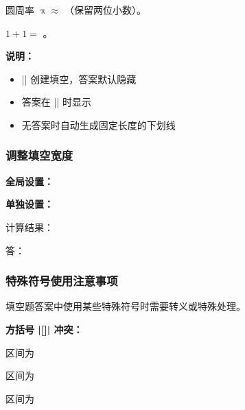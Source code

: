 \begin{latexcode}
  \begin{question}
    圆周率 $\uppi \approx$ \fillin[3.14]（保留两位小数）。
  \end{question}

  \begin{question}
    $1 + 1 = $ \fillin[2]。
  \end{question}
\end{latexcode}

\textbf{说明：}
\begin{itemize}
  \item |\fillin[答案]| 创建填空，答案默认隐藏
  \item 答案在 || 时显示
  \item 无答案时自动生成固定长度的下划线
\end{itemize}

\subsubsection{调整填空宽度}

\textbf{全局设置：}

\begin{latexcode}
\end{latexcode}

\textbf{单独设置：}

\begin{latexcode}
  计算结果：\fillin[width = 8em][很长的答案内容]

  答：\fillin[width = 2em][是]
\end{latexcode}

\subsubsection{特殊符号使用注意事项}

填空题答案中使用某些特殊符号时需要转义或特殊处理。

\textbf{方括号 |[]| 冲突：}

\begin{latexcode}
  区间为 \fillin[[2,3)]

  区间为 \fillin[{$[2,3)$}]

  区间为 \fillin[{$(−\infty, 1]$}]
\end{latexcode}

